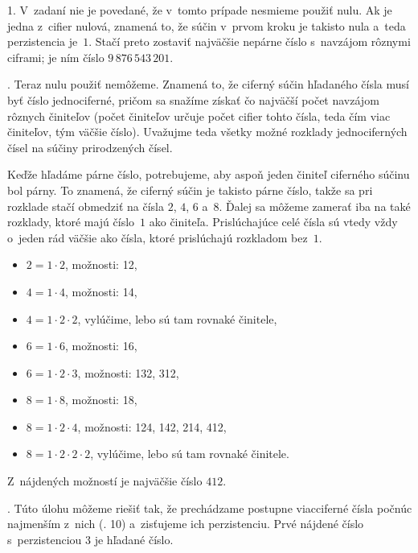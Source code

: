 {%
1.
V~zadaní nie je povedané, že v~tomto prípade nesmieme použiť nulu. Ak je jedna
z~cifier nulová, znamená to, že súčin v~prvom kroku je takisto nula a~teda perzistencia je~$1$.
Stačí preto zostaviť najväčšie nepárne číslo s~navzájom rôznymi ciframi; je ním číslo $9\,876\,543\,201$.

.
Teraz nulu použiť nemôžeme. Znamená to, že ciferný súčin hľadaného čísla musí byť číslo jednociferné,
pričom sa snažíme získať čo najväčší počet navzájom rôznych činiteľov (počet činiteľov určuje počet cifier tohto
čísla, teda čím viac činiteľov, tým väčšie číslo).
Uvažujme teda všetky možné rozklady jednociferných čísel na súčiny prirodzených čísel.

Keďže hľadáme párne číslo, potrebujeme, aby aspoň jeden činiteľ ciferného súčinu bol párny.
To znamená, že ciferný súčin je takisto párne číslo, takže sa pri rozklade stačí obmedziť na čísla $2$, $4$, $6$ a~$8$.
Ďalej sa môžeme zamerať iba na také rozklady, ktoré majú číslo~$1$ ako činiteľa. Prislúchajúce celé čísla sú vtedy
vždy o~jeden rád väčšie ako čísla, ktoré prislúchajú rozkladom bez~$1$.
\begin{itemize}
    \item $2=1\cdot2$, možnosti: 12,
    \item $4=1\cdot4$, možnosti: 14,
    \item $4=1\cdot2\cdot2$, vylúčime, lebo sú tam rovnaké činitele,
    \item $6=1\cdot6$, možnosti: 16,
    \item $6=1\cdot2\cdot3$, možnosti: 132, 312,
    \item $8=1\cdot8$, možnosti: 18,
    \item $8=1\cdot2\cdot4$, možnosti: 124, 142, 214, 412,
    \item $8=1\cdot2\cdot2\cdot2$, vylúčime, lebo sú tam rovnaké činitele.
\end{itemize}
Z~nájdených možností je najväčšie číslo $412$.

.
Túto úlohu môžeme riešiť tak, že prechádzame postupne viacciferné čísla počnúc najmenším z~nich  (\tj. 10) a~zisťujeme ich perzistenciu. Prvé nájdené číslo
s~perzistenciou 3 je hľadané číslo.

}

